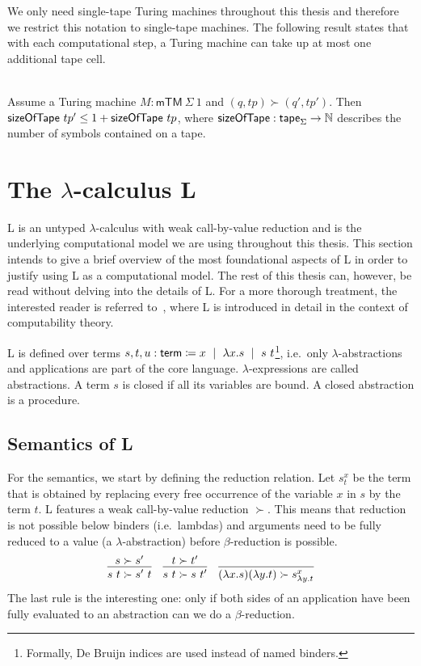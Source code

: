We only need single-tape Turing machines throughout this thesis and therefore we restrict this notation to single-tape machines.
The following result states that with each computational step, a Turing machine can take up at most one additional tape cell. 
\begin{lemma}\label{lem:time_bounds_space}~\\
  Assume a Turing machine $M : \textsf{mTM}~\Sigma~1$ and $(q, tp) \succ (q', tp')$. Then $\textsf{sizeOfTape}~tp' \le 1 +{\textsf{sizeOfTape}~tp}$, 
  where $\textsf{sizeOfTape} : \textsf{tape}_\Sigma \rightarrow \mathbb{N}$ describes the number of symbols contained on a tape.
\end{lemma}

\newcommand{\Lterm}{\textsf{term}}
\section{The $\lambda$-calculus L}
L is an untyped $\lambda$-calculus with weak call-by-value reduction and is the underlying computational model we are using throughout this thesis. 
This section intends to give a brief overview of the most foundational aspects of L in order to justify using L as a computational model. The rest of this thesis can, however, be read without delving into the details of L. 
For a more thorough treatment, the interested reader is referred to~\cite{ForsterSmolka:2017:L-Computability}, where L is introduced in detail in the context of computability theory.

L is defined over terms\mnote{\Lterm} $s, t, u: \Lterm \defeq x \bnfmid \lambda x. s \bnfmid s~t$\footnote{Formally, De Bruijn indices are used instead of named binders.}, i.e.\ only $\lambda$-abstractions and applications are part of the core language. $\lambda$-expressions are called abstractions. A term $s$ is closed if all its variables are bound. A closed abstraction is a procedure.

\subsection{Semantics of L}
For the semantics, we start by defining the reduction relation. Let $s^x_t$ be the term that is obtained by replacing every free occurrence of the variable $x$ in $s$ by the term $t$. 
L features a weak call-by-value reduction $\succ$. This means that reduction is not possible below binders (i.e.\ lambdas) and arguments need to be fully reduced to a value (a $\lambda$-abstraction) before $\beta$-reduction is possible.
\begin{align*}
  \infer{s~t \succ s'~t}{s \succ s'} \quad \infer{s~t \succ s~t'}{t \succ t'} \quad \infer{(\lambda x.s)(\lambda y.t) \succ s^x_{\lambda y. t}}{} 
\end{align*}
The last rule is the interesting one: only if both sides of an application have been fully evaluated to an abstraction can we do a $\beta$-reduction. 


